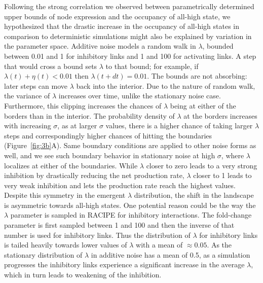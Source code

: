 \documentclass[11pt]{article}
\providecommand{\DIFaddtex}[1]{{\protect\color{red}#1}} %
\providecommand{\DIFdeltex}[1]{} %
\providecommand{\DIFaddbegin}{} %
\providecommand{\DIFaddend}{} %
\providecommand{\DIFdelbegin}{} %
\providecommand{\DIFdelend}{} %
\providecommand{\DIFadd}[1]{\texorpdfstring{\DIFaddtex{#1}}{#1}} %
\providecommand{\DIFdel}[1]{\texorpdfstring{\DIFdeltex{#1}}{}} %
\providecommand{\DIFaddincludegraphics}[2][]{\DIFOincludegraphics[#1]{#2}} %
\providecommand{\DIFdelincludegraphics}[2][]{}
\DeclareRobustCommand{\DIFaddbegin}{\DIFOaddbegin \let\includegraphics\DIFaddincludegraphics} %
\DeclareRobustCommand{\DIFaddend}{\DIFOaddend \let\includegraphics\DIFOincludegraphics} %
\DeclareRobustCommand{\DIFdelbegin}{\DIFOdelbegin \let\includegraphics\DIFdelincludegraphics} %
\DeclareRobustCommand{\DIFdelend}{\DIFOaddend \let\includegraphics\DIFOincludegraphics} %
\begin{document}
\DIFaddend Following the strong correlation we observed between parametrically determined upper bounds of node expression and the \DIFdelbegin \DIFdel{MRT }\DIFdelend \DIFaddbegin \DIFadd{occupancy }\DIFaddend of all-high state, we hypothesized that the drastic increase in the \DIFdelbegin \DIFdel{MRT }\DIFdelend \DIFaddbegin \DIFadd{occupancy }\DIFaddend of all-high states in comparison to deterministic simulations might also be explained by variation in the parameter space. Additive noise models a random walk in $\lambda$, bounded between 0.01 and 1 for inhibitory links and 1 and 100 for activating links. \DIFdelbegin \DIFdel{Any step crossing the boundary is absorbed at the boundary. For }\DIFdelend \DIFaddbegin \DIFadd{A step that would cross a bound sets $\lambda$ to that bound; for }\DIFaddend example, if $\lambda(t) + \eta(t) < 0.01$ then $\lambda(t+dt) = 0.01$. \DIFaddbegin \DIFadd{The bounds are not absorbing: later steps can move $\lambda$ back into the interior. }\DIFaddend Due to the nature of random walk, the variance of $\lambda$ increases over time, unlike the stationary noise case. Furthermore, \DIFdelbegin \DIFdel{the absorbing boundaries increase the }\DIFdelend \DIFaddbegin \DIFadd{this clipping increases the }\DIFaddend chances of $\lambda$ being at either of the borders than in the interior. The probability density of $\lambda$ at the borders increases with increasing $\sigma$, as at larger $\sigma$ values, there is a higher chance of taking larger $\lambda$ steps and correspondingly higher chances of hitting the boundaries (Figure~\ref{fig:3b}A). Same boundary conditions are applied to other noise forms as well, and we see such boundary behavior in stationary noise at high $\sigma$, where $\lambda$ localizes at either of the boundaries. While $\lambda$ closer to zero leads to a very strong inhibition by drastically reducing the net production rate, $\lambda$ closer to 1 leads to very weak inhibition and lets the production rate reach the highest values. Despite this symmetry in the emergent $\lambda$ distribution, the shift in the landscape is asymmetric towards all-high states. One potential reason could be the way the $\lambda$ parameter is sampled in RACIPE for inhibitory interactions. The fold-change parameter is first sampled between 1 and 100 and then the inverse of that number is used for inhibitory links. Thus the distribution of $\lambda$ for inhibitory links is tailed heavily towards lower values of $\lambda$ with a mean of $\approx0.05$. As the stationary distribution of $\lambda$ in additive noise has a mean of 0.5, as a simulation progresses the inhibitory links experience a significant increase in the average $\lambda$, which in turn leads to weakening of the inhibition.
\end{document}
